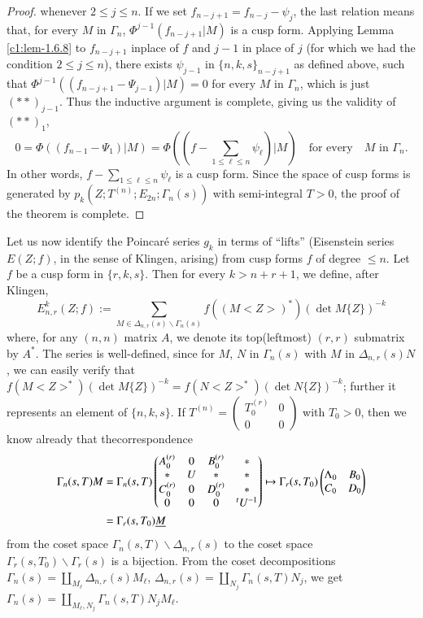 \begin{proof}
whenever $2\leq j\leq n$. If we set $f_{n-j+1}=f_{n-j}-\psi_{j}$, the
last relation means that, for every $M$ in $\Gamma_{n}$,
$\Phi^{j-1}(f_{n-j+1}|M)$ is a cusp form. Applying Lemma
\ref{c1:lem-1.6.8} to $f_{n-j+1}$ in\pageoriginale place of $f$ and $j-1$
in place of $j$ (for which we had the condition $2\leq j\leq n$),
there exists $\psi_{j-1}$ in $\{n,k,s\}_{n-j+1}$ as defined above,
such that $\Phi^{j-1}((f_{n-j+1}-\Psi_{j-1})|M)=0$ for every $M$ in
$\Gamma_{n}$, which is just $(\ast\ast)_{j-1}$. Thus the inductive
argument is complete, giving us the validity of $(\ast\ast)_{1}$, \ie 
$$
0=\Phi((f_{n-1}-\Psi_{1})|M)=\Phi((f-\sum_{1\leq \ell \leq
  n}\psi_{\ell})|M)\quad\text{for every}\quad M\text{ \  in
  \ }\Gamma_{n}.
$$
In other words, $f-\sum\limits_{1\leq \ell\leq n}\psi_{\ell}$ is a
cusp form. Since the space of cusp forms is generated by
$p_{k}(Z;T^{(n)};E_{2n};\Gamma_{n}(s))$ with semi-integral $T>0$, the
proof of the theorem is complete.
\end{proof}

Let us now identify the Poincar\'e series $g_{k}$ in terms of
``lifts'' (\ie\break Eisenstein series $E(Z;f)$, in the sense of Klingen,
arising) from cusp forms $f$ of degree $\leq n$. Let $f$ be a cusp
form in $\{r,k,s\}$. Then for every $k>n+r+1$, we define, after
Klingen,
$$
E^{k}_{n,r}(Z;f):=\sum_{M\in\Delta_{n,r}(s)\backslash
  \Gamma_{n}(s)}f((M<Z>)^{\ast})(\det M\{Z\})^{-k}
$$
where, for any $(n,n)$ matrix $A$, we denote its top(leftmost) $(r,r)$
submatrix by $A^{\ast}$. The series is well-defined, since for $M$,
$N$ in $\Gamma_{n}(s)$ with $M$ in $\Delta_{n,r}(s)N$, we can easily
verify that $f(M<Z>^{\ast})(\det M\{Z\})^{-k}=f(N<Z>^{\ast})(\det
N\{Z\})^{-k}$; further it represents an element of $\{n,k,s\}$. If
$T^{(n)}=\left(\begin{smallmatrix} T^{(r)}_{0} & 0\\ 0 & 0 
\end{smallmatrix}\right)$ with $T_{0}>0$, then we know already that
the\pageoriginale correspondence
\begin{align*}
\Gamma_{n}(s,T)M&=\Gamma_{n}(s,T)
\begin{pmatrix}
A^{(r)}_{0} & 0 & B^{(r)}_{0} & \ast\\
\ast & U & \ast & \ast\\
C^{(r)}_{0} & 0 & D^{(r)}_{0} & \ast\\
0 & 0 & 0 & {}^{t}U^{-1}
\end{pmatrix}
\mapsto \Gamma_{r}(s,T_{0})
\begin{pmatrix}
\Lambda_{0} & B_{0}\\
C_{0} & D_{0}
\end{pmatrix}\\
&=\Gamma_{r}(s,T_{0})\underline{M}
\end{align*}
from the coset space $\Gamma_{n}(s,T)\backslash \Delta_{n,r}(s)$ to
the coset space $\Gamma_{r}(s,T_{0})\backslash \Gamma_{r}(s)$ is a
bijection. From the coset decompositions
$\Gamma_{n}(s)=\coprod\limits_{M_{\ell}}\Delta_{n,r}(s)M_{\ell}$,
$\Delta_{n,r}(s)=\coprod\limits_{N_{j}}\Gamma_{n}(s,T)N_{j}$, we get
$\Gamma_{n}(s)=\coprod\limits_{M_{\ell},N_{j}}\Gamma_{n}(s,T)N_{j}M_{\ell}$. 


